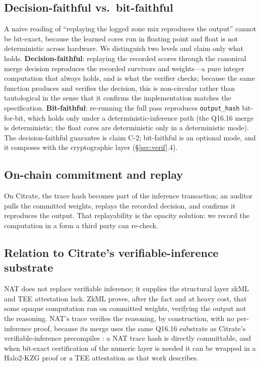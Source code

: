 \documentclass[11pt]{article}
\newcommand{\Qff}{Q16.16}
\begin{document}
\subsection{Decision-faithful vs.\ bit-faithful}
A naive reading of ``replaying the logged zone mix reproduces the output'' cannot be bit-exact,
because the learned cores run in floating point and float is not deterministic across hardware. We
distinguish two levels and claim only what holds. \textbf{Decision-faithful}: replaying the recorded
scores through the canonical merge decision reproduces the recorded survivors and weights---a pure
integer computation that always holds, and is what the verifier checks; because the same function
produces and verifies the decision, this is non-circular rather than tautological in the sense that it
confirms the implementation matches the specification. \textbf{Bit-faithful}: re-running the full pass
reproduces \texttt{output\_hash} bit-for-bit, which holds only under a deterministic-inference path
(the \Qff{} merge is deterministic; the float cores are deterministic only in a deterministic mode).
The decision-faithful guarantee is claim C-2; bit-faithful is an optional mode, and it composes with
the cryptographic layer (\S\ref{sec:verif}.4).

\subsection{On-chain commitment and replay}
On Citrate, the trace hash becomes part of the inference transaction; an auditor pulls the committed
weights, replays the recorded decision, and confirms it reproduces the output. That replayability is
the opacity solution: we record the computation in a form a third party can re-check.

\subsection{Relation to Citrate's verifiable-inference substrate}
NAT does not replace verifiable inference; it supplies the structural layer zkML and TEE attestation
lack. ZkML proves, after the fact and at heavy cost, that some opaque computation ran on committed
weights, verifying the output not the reasoning. NAT's trace verifies the reasoning, by construction,
with no per-inference proof, because its merge uses the same \Qff{} substrate as Citrate's
verifiable-inference precompiles \citep{citrate10}: a NAT trace hash is directly committable, and when
bit-exact certification of the numeric layer is needed it can be wrapped in a Halo2-KZG proof or a
TEE attestation as that work describes.
\end{document}
